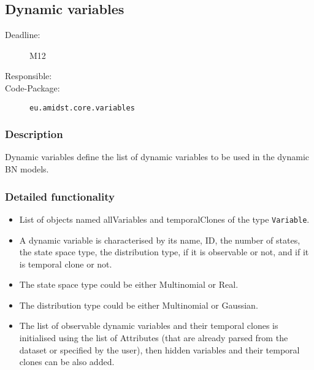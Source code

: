 \newpage
\subsection{Dynamic variables}
\label{Functionality:ID}

\begin{description}
\item[Deadline:] M12
\item[Responsible:] 
\item[Code-Package:] \texttt{eu.amidst.core.variables}
\end{description}

\subsubsection*{Description}

Dynamic variables define the list of dynamic variables to be used in the dynamic BN models.

\subsubsection*{Detailed functionality}

\begin{itemize}
\item List of objects named allVariables and temporalClones of the type \texttt{Variable}. 

\item A dynamic variable is characterised by its name, ID, the number of states, the state space type, the distribution type, if it is observable or not, and if it is temporal clone or not.

\item The state space type could be either Multinomial or Real.

\item The distribution type could be either Multinomial or Gaussian.

\item The list of observable dynamic variables and their temporal clones is initialised using the list of Attributes (that are already parsed from the dataset or specified by the user), then hidden variables and their temporal clones can be also added.

\end{itemize}


